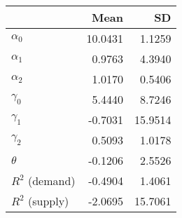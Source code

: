 
\begin{tabular}[t]{lrr}
\toprule
  & Mean & SD\\
\midrule
$\alpha_{0}$ & 10.0431 & 1.1259\\
$\alpha_{1}$ & 0.9763 & 4.3940\\
$\alpha_{2}$ & 1.0170 & 0.5406\\
$\gamma_{0}$ & 5.4440 & 8.7246\\
$\gamma_{1}$ & -0.7031 & 15.9514\\
$\gamma_{2}$ & 0.5093 & 1.0178\\
$\theta$ & -0.1206 & 2.5526\\
$R^{2}$ (demand) & -0.4904 & 1.4061\\
$R^{2}$ (supply) & -2.0695 & 15.7061\\
\bottomrule
\end{tabular}
